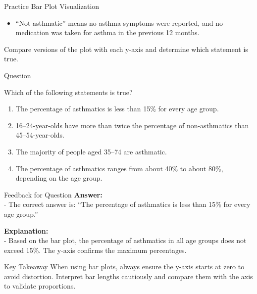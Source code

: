 \documentclass[
  ignorenonframetext,
]{beamer}
\providecommand{\tightlist}{%
  \setlength{\itemsep}{0pt}\setlength{\parskip}{0pt}}
\begin{document}
\begin{frame}{Practice Bar Plot Visualization}
\label{practice-bar-plot-visualization-2}
\begin{itemize}
\tightlist
\item
  ``Not asthmatic'' means no asthma symptoms were reported, and no
  medication was taken for asthma in the previous 12 months.
\end{itemize}

Compare versions of the plot with each y-axis and determine which
statement is true.
\end{frame}

\begin{frame}{Question}
\label{question-8}
\begin{block}{Which of the following statements is true?}
\label{which-of-the-following-statements-is-true-1}
\begin{enumerate}
\tightlist
\item
  The percentage of asthmatics is less than 15\% for every age group.
\item
  16--24-year-olds have more than twice the percentage of non-asthmatics
  than 45--54-year-olds.
\item
  The majority of people aged 35--74 are asthmatic.
\item
  The percentage of asthmatics ranges from about 40\% to about 80\%,
  depending on the age group.
\end{enumerate}
\end{block}
\end{frame}

\begin{frame}{Feedback for Question}
\label{feedback-for-question-7}
\textbf{Answer:}\\
- The correct answer is: ``The percentage of asthmatics is less than
15\% for every age group.''

\textbf{Explanation:}\\
- Based on the bar plot, the percentage of asthmatics in all age groups
does not exceed 15\%. The y-axis confirms the maximum percentages.
\end{frame}

\begin{frame}{Key Takeaway}
\label{key-takeaway-1}
When using bar plots, always ensure the y-axis starts at zero to avoid
distortion. Interpret bar lengths cautiously and compare them with the
axis to validate proportions.
\end{frame}
\end{document}
